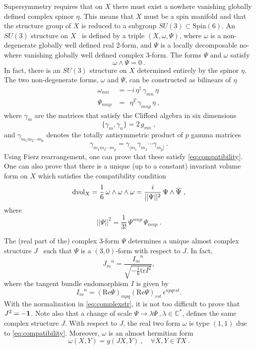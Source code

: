 \documentclass[12pt,a4paper]{article}
\newcommand{\IC}{\mathbb{C}}
\def\bar#1{\overline{#1}}
\def\to{\rightarrow}
\def\d{\textrm{d}}
\def\tr{\textrm{tr}}
\theoremstyle{definition}
\begin{document}
Supersymmetry requires that on $X$ there must exist  a nowhere vanishing globally defined complex spinor $\eta$.
This means that $X$ must be a spin manifold and that the structure group of  $X$ is reduced to 
a subgroup $SU(3)\subset \text{Spin}(6)$.  
An $SU(3)$ structure on $X$~\citep{0444.53032, 1024.53018, LopesCardoso:2002hd}  is defined by a triple $(X,\omega,\Psi)$, where $\omega$ is a non-degenerate globally well defined real 2-form, and $\Psi$ is a locally decomposable no-where vanishing globally well defined complex 3-form.  
The forms $\Psi$ and $\omega$ satisfy
\begin{equation}
 \omega\wedge\Psi = 0~.\label{eq:compatibility}
 \end{equation}
In fact, there is an $SU(3)$ structure on $X$ determined entirely by the spinor $\eta$.  The two non-degenerate forms, $\omega$ and $\Psi$, can be constructed as bilinears of  $\eta$
\begin{equation*}
\begin{split}
\omega_{mn} &= -i \, \eta^\dagger \,\gamma_{mn}\, \eta\\
\Psi_{mnp} &= ~~\eta^T\,\gamma_{mnp}\,\eta~,
\end{split}
\end{equation*}
where $\gamma_m$ are the matrices that satisfy the Clifford algebra in six dimensions
\[ \{\gamma_m,\gamma_n\} = 2\, g_{mn}~,\]
and $\gamma_{m_1m_2\cdots m_p}$ denotes the totally antisymmetric product of $p$ gamma matrices
\[\gamma_{m_1m_2\cdots m_p} = \gamma_{[m_1}\gamma_{m_2}\cdots\gamma_{m_p]}~.\] 
Using Fierz rearrangement, one can prove that these satisfy  \eqref{eq:compatibility}.  One can also prove that there is a unique (up to a constant) invariant volume form on $X$ which satisfies
the compatibility condition
\begin{equation}
\d{\rm vol}_X =  \frac{1}{6}\, \omega\wedge\omega\wedge\omega =
\frac{i}{||\Psi||^2}\, \Psi\wedge\bar\Psi~,\label{eq:volume}
\end{equation} 
where
\[ ||\Psi||^2 = \frac{1}{3!}\, \Psi^{mnp}\, \Psi_{mnp}~.\]


The (real part of the) complex 3-form $\Psi$ determines a unique almost complex structure $J$~\citep{MR1871001} such that $\Psi$ is a $(3,0)$-form
with respect to $J$.  In fact, 
\begin{equation}
\label{eq:complexstr}
{J_m}^n=\frac{{I_m}^n}{\sqrt{-\frac{1}{6}\tr I^2}},
\end{equation}
where the tangent bundle endomorphism $I$ is given by
\begin{equation}
{I_m}^n=(\textrm{Re}\Psi)_{mpq}(\textrm{Re}\Psi)_{rst}\,\epsilon^{npqrst}.\label{eq:CSnorm}
\end{equation}
With the normalization in \eqref{eq:complexstr},  it is not too difficult to prove that $J^2=-{\bf 1}$.  Note also that a change of scale $\Psi\to\lambda\Psi~,\lambda\in\IC^*$, defines the same complex structure $J$. 
With respect to $J$, the real two form $\omega$ is type $(1,1)$ due to \eqref{eq:compatibility}.  Moreover, $\omega$ is an almost hermitian form
\begin{equation}
\omega(X,Y) =  g(JX, Y)~,\quad \forall X, Y\in TX~.
\end{equation}
\end{document}
